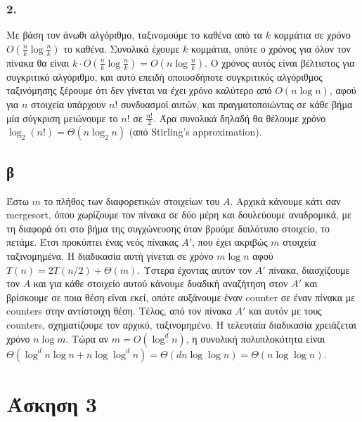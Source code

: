\documentclass[12pt,a4paper]{article}
\begin{document}
  \subsubsection{2.}
    Με βάση τον άνωθι αλγόριθμο, ταξινομούμε το καθένα από τα \( k \) κομμάτια
    σε χρόνο \( Ο(\frac{n}{k}\log{\frac{n}{k}}) \) το καθένα.
    Συνολικά έχουμε \( k \) κομμάτια, οπότε ο χρόνος για όλον τον πίνακα θα 
    είναι \( k\cdot O(\frac{n}{k}\log{\frac{n}{k}})=O(n\log{\frac{n}{k}}) \).
    Ο χρόνος αυτός είναι βέλτιστος για συγκριτικό αλγόριθμο, και αυτό επειδή 
    οποιοσδήποτε συγκριτικός αλγόριθμος ταξινόμησης ξέρουμε ότι δεν γίνεται να 
    έχει χρόνο καλύτερο από \( O(n\log{n}) \), αφού για \(n\) στοιχεία υπάρχουν
    \(n!\) συνδυασμοί αυτών, και πραγματοποιώντας σε κάθε βήμα μία σύγκριση 
    μειώνουμε το \(n!\) σε \(\frac{n!}{2}\). 
    Άρα συνολικά δηλαδή θα θέλουμε χρόνο \(\log_{2}(n!) = \Theta(n\log_{2}{n})\)
    (από {\latintext Stirling's approximation}).
  
  \subsection{β}
    Έστω \( m \) το πλήθος των διαφορετικών στοιχείων του \( Α \). Αρχικά 
    κάνουμε κάτι σαν {\latintext mergesort}, όπου χωρίζουμε τον πίνακα σε δύο
    μέρη και δουλεύουμε αναδρομικά, με τη διαφορά ότι στο βήμα της συγχώνευσης
    όταν βρούμε διπλότυπο στοιχείο, το πετάμε. Έτσι προκύπτει ένας νεός πίνακας
    \( Α' \), που έχει ακριβώς \( m \) στοιχεία ταξινομημένα. Η διαδικασία αυτή
    γίνεται σε χρόνο \( m\log{n} \) αφού \( T(n)=2T(n/2)+\Theta(m) \). Ύστερα
    έχοντας αυτόν τον \( Α' \) πίνακα, διασχίζουμε τον \( Α \) και για κάθε 
    στοιχείο αυτού κάνουμε δυαδική αναζήτηση στον \(  Α' \) και βρίσκουμε σε 
    ποια θέση είναι εκεί, οπότε αυξάνουμε έναν {\latintext counter} σε έναν 
    πίνακα με counters στην αντίστοιχη θέση. Τέλος, από τον πίνακα \( Α' \)
    και αυτόν με τους {\latintext counters}, σχηματίζουμε τον αρχικό, 
    ταξινομημένο. Η τελευταία διαδικασία χρειάζεται χρόνο \( n\log{m} \).
    Τώρα αν \( m=O(\log^d{n}) \), η συνολική πολυπλοκότητα είναι \( \Theta
    (\log^d{n}\log{n} + n\log{\log^d{n}}) = \Theta(dn\log{\log{n}}) =
    \Theta(n\log{\log{n}}) \).

  \section{Άσκηση 3}
\end{document}
